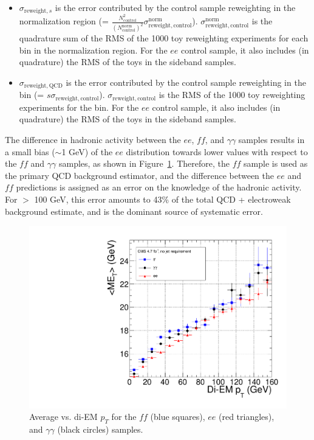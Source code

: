 \documentclass[dissertation_bw.tex]{subfiles}
\begin{document}
\begin{itemize}
\item $\sigma_{\mathrm{reweight,}s}$ is the error contributed by the control sample reweighting in the normalization region (= $\frac{N_{\mathrm{control}}^{2}}{(N_{\mathrm{control}}^{\mathrm{norm}})^{2}}\sigma_{\mathrm{reweight,control}}^{\mathrm{norm}}$).  $\sigma_{\mathrm{reweight,control}}^{\mathrm{norm}}$ is the quadrature sum of the RMS of the 1000 toy reweighting experiments for each \MET bin in the normalization region.  For the $ee$ control sample, it also includes (in quadrature) the RMS of the toys in the sideband samples.

\item $\sigma_{\mathrm{reweight,QCD}}$ is the error contributed by the control sample reweighting in the \MET bin (= $s\sigma_{\mathrm{reweight,control}}$).  $\sigma_{\mathrm{reweight,control}}$ is the RMS of the 1000 toy reweighting experiments for the \MET bin.  For the $ee$ control sample, it also includes (in quadrature) the RMS of the toys in the sideband samples.

\end{itemize}

The difference in hadronic activity between the $ee$, $\mathit{ff}$, and $\gamma\gamma$ samples results in a small bias ($\sim$1 GeV) of the $ee$ \MET distribution towards lower values with respect to the $\mathit{ff}$ and $\gamma\gamma$ samples, as shown in Figure~\ref{fig:avg_MET_vs_di-EM_pT}.  Therefore, the $\mathit{ff}$ sample is used as the primary QCD background estimator, and the difference between the $ee$ and $\mathit{ff}$ predictions is assigned as an error on the knowledge of the hadronic activity.  For \MET $>$ 100 GeV, this error amounts to 43\% of the total QCD + electroweak background estimate, and is the dominant source of systematic error.

\begin{figure}
	\centering
	\includegraphics[scale=0.4]{avg_MET_vs_di-EM_pT}
	\caption{Average \MET vs. di-EM $p_{T}$ for the $\mathit{ff}$ (blue squares), $ee$ (red triangles), and $\gamma\gamma$ (black circles) samples.}
	\label{fig:avg_MET_vs_di-EM_pT}
\end{figure}
\end{document}
